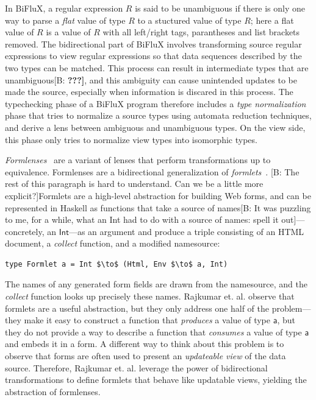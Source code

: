 \documentclass[acmsmall,review,anonymous]{acmart}
\newcommand{\FINISH}[3]{\ifdraft\textcolor{#1}{[#2: #3]}\fi}
\newcommand{\bcp}[1]{\FINISH{dkred}{B}{#1}}
\newcommand{\BCP}[1]{\FINISH{dkred}{B}{\bf #1}}
\newcommand{\codefont}[1]{\ensuremath{\mathsf{#1}}}
\newcommand{\kw}[1]{\textcolor{dkred}{\ensuremath{\mathsf{#1}}}}
\begin{document}
In BiFluX, a regular expression $R$ is said to be unambiguous if there is only
one way to parse a {\em flat} value of type $R$ to a stuctured value of type
$R$; here a flat value of $R$ is a value of $R$ with all left/right tags,
parantheses and list brackets removed. The bidirectional part of BiFluX involves
transforming source regular expressions to view regular expressions so that
data sequences described by the two types can be matched. This process can
result in intermediate types that are unambiguous\BCP{???}, and this
ambiguity can cause 
unintended updates to be made the source, especially when information is
discared in this process. The typechecking phase of a BiFluX program therefore
includes a {\em type normalization} phase that tries to normalize a source types
using automata reduction techniques, and derive a lens between ambiguous and
unambiguous types. On the view side, this phase only tries to normalize view
types into isomorphic types.

{\em Formlenses}~\cite{rajkumar2014lenses} are a variant of lenses that
perform transformations up to equivalence. Formlenses are a bidirectional
generalization of {\em formlets}~\cite{cooper2008essence}. \bcp{The rest of
  this paragraph is hard to understand.  Can we be a little more
  explicit?}Formlets are a high-level abstraction for building Web forms,
and can be represented in Haskell as functions that take a source of
names\bcp{It was puzzling to me, for a while, what an Int had to do with a
  source of names: spell it out}---concretely, an \kw{Int}---as an argument
and produce a triple consisting of an HTML document, a {\em collect}
function, and a modified namesource:
\begin{center}
\begin{lstlisting}
type Formlet a = Int $\to$ (Html, Env $\to$ a, Int)
\end{lstlisting}
\end{center}
The names of any generated form fields are drawn from the namesource, and the
{\em collect} function looks up precisely these names.
Rajkumar et. al. observe that formlets are a useful
abstraction, but they only address one half of the problem---they make it easy
to construct a function that {\em produces} a value of type \codefont{a}, but they do
not provide a way to describe a function that {\em consumes} a value of type
\codefont{a} and embeds it in a form. A different way to think about this problem is
to observe that forms are often used to present an {\em updateable view} of the
data source. Therefore, Rajkumar et. al. leverage the power of bidirectional
transformations to define formlets that behave like updatable views, yielding
the abstraction of formlenses.
\end{document}
